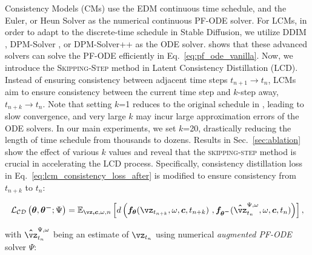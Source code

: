 \documentclass{article} %
\begin{document}
Consistency Models (CMs) \citep{song2023consistency} use the EDM \citep{karras2022elucidating} continuous time schedule, and the Euler, or Heun Solver as the numerical continuous PF-ODE solver. 
For LCMs, in order to adapt to the discrete-time schedule in Stable Diffusion, we utilize DDIM \citep{song2020denoising}, DPM-Solver \citep{lu2022dpm}, or DPM-Solver++ \citep{lu2022dpm++} as the ODE solver. \citep{lu2022dpm} shows that these advanced solvers can solve the PF-ODE efficiently in Eq.~\ref{eq:pf_ode_vanilla}.
Now, we introduce the \textsc{Skipping-Step} method in Latent Consistency Distillation (LCD). Instead of ensuring consistency between adjacent time steps $t_{n+1} \rightarrow t_{n}$, LCMs aim to ensure consistency between the current time step and $k$-step away, $t_{n+k} \rightarrow t_{n}$. Note that setting $k$=1 reduces to the original schedule in \citep{song2023consistency}, leading to slow convergence, and very large $k$ may incur large approximation errors
of the ODE solvers. In our main experiments, we set $k$=20, drastically reducing the length of time schedule from thousands to dozens. Results in Sec.~\ref{sec:ablation} show the effect of various $k$ values and reveal that the \textsc{skipping-step} method is crucial in accelerating the LCD process. 
Specifically, consistency distillation loss in Eq.~\ref{eq:lcm_consistency_loss_after} is modified to ensure consistency from $t_{n+k}$ to $t_{n}$:
\begin{small}
\begin{equation}
\mathcal{L_{CD}}\left(\boldsymbol{\theta},\boldsymbol{\theta^-};\Psi\right) = \mathbb{E}_{\boldsymbol{\vz,c},\omega,n}\left[d\left(\boldsymbol{f_\theta}(\boldsymbol{\vz}_{t_{n+k}}, \omega, \boldsymbol{c}, t_{n+k})\ , \boldsymbol{f_{\theta^-}}(\boldsymbol{\hat{\vz}}^{\Psi,\omega}_{t_{n}}, \omega, \boldsymbol{c}, t_{n})\right)\right],
\label{eq:lcm_consistency_loss}
\end{equation}
\end{small}
with $\boldsymbol{\hat{\vz}}^{\Psi,\omega}_{t_{n}}$ being an
estimate of $\vz_{t_{n}}$ using numerical {\em{augmented PF-ODE}} solver $\Psi$:
\end{document}

